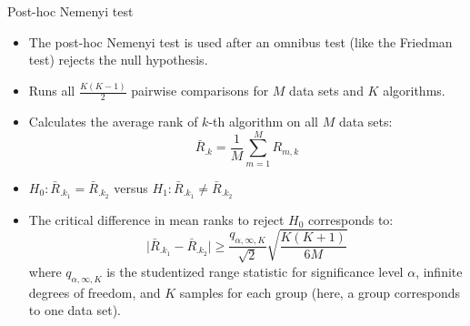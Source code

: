 \documentclass[11pt,compress,t,notes=noshow, xcolor=table]{beamer}
\begin{document}
\begin{frame}{Post-hoc Nemenyi test}

\begin{itemize}
\setlength\itemsep{1em}
\item The post-hoc Nemenyi test is used after an omnibus test (like the Friedman test) rejects the null hypothesis.
\item Runs all $\frac{K(K-1)}{2}$ pairwise comparisons for $M$ data sets and $K$ algorithms.
\item Calculates the average rank of $k$-th algorithm on all $M$ data sets:
$$
\bar{R}_{.k} =\frac{1}{M} \sum_{m=1}^M R_{m, k}
$$
\item $H_0: \bar{R}_{.k_1} = \bar{R}_{.k_2}$ versus
$H_1: \bar{R}_{.k_1} \neq \bar{R}_{.k_2}$
\item The critical difference in mean ranks to reject $H_0$ corresponds to:
$$
\vert \bar{R}_{.k_1} - \bar{R}_{.k_2} \vert \geq \frac{q_{\alpha, \infty, K}}{\sqrt{2}} \sqrt{\frac{K(K + 1)}{6M}}
$$
where $q_{\alpha, \infty, K}$ is the studentized range statistic for significance level $\alpha$, infinite degrees of freedom, and $K$ samples for each group (here, a group corresponds to one data set).
\end{itemize}
\end{frame}
\end{document}
